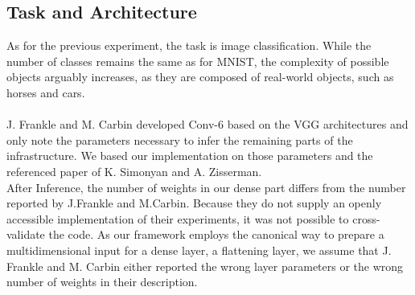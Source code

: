 \subsection*{Task and Architecture}
As for the previous experiment, the task is image classification. While the number of classes remains the same as for MNIST, the complexity of possible objects arguably increases, as they are composed of real-world objects, such as horses and cars.\\
\\
J. Frankle and M. Carbin developed Conv-6 based on the VGG architectures and only note the parameters necessary to infer the remaining parts of the infrastructure.\cite{LTH} We based our implementation on those parameters and the referenced paper of K. Simonyan and A. Zisserman.\cite{VGG}\\
After Inference, the number of weights in our dense part differs from the number reported by J.Frankle and M.Carbin. Because they do not supply an openly accessible implementation of their experiments, it was not possible to cross-validate the code.
As our framework employs the canonical way to prepare a multidimensional input for a dense layer, a flattening layer, we assume that J. Frankle and M. Carbin either reported the wrong layer parameters or the wrong number of weights in their description.
\newpage 
